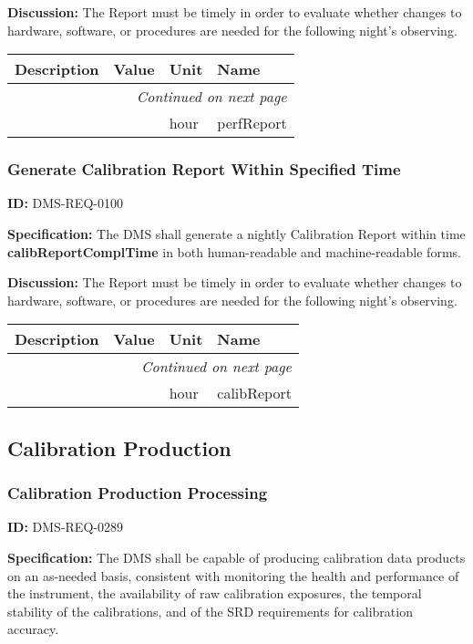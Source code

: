 \documentclass[SE,toc,lsstdraft]{lsstdoc}
\makeatletter
\newcommand{\paramname}[1]{\hspace{0pt}#1}
\newcommand{\unitname}[1]{\hspace{0pt}#1}
\newenvironment{parameters}[0]{%
\setlength\LTleft{0pt}
\setlength\LTright{\fill}
\begin{small}
\begin{longtable}[]{|p{0.5\textwidth}|l|p{0.6in}|p{1.74in}@{}|}

\hline \textbf{Description} & \textbf{Value} & \textbf{Unit} & \textbf{Name} \\ \hline
\endhead

\hline \multicolumn{4}{r}{\emph{Continued on next page}} \\
\endfoot

\hline\hline
\endlastfoot
}{%
\hline
\end{longtable}
\end{small}
}
\makeatother
\begin{document}
\textbf{Discussion:} The Report must be timely in order to evaluate whether changes to hardware, software, or procedures are needed for the following night's observing.



\begin{parameters}

&

&
\unitname{%
hour
}
&
\paramname{%
perfReport
} \\\hline
\end{parameters}




\subsubsection{Generate Calibration Report Within Specified Time}

\label{DMS-REQ-0100}
\textbf{ID:} DMS-REQ-0100

\textbf{Specification:} The DMS shall generate a nightly Calibration Report within time \textbf{calibReportComplTime }in both human-readable and machine-readable forms.

\textbf{Discussion:} The Report must be timely in order to evaluate whether changes to hardware, software, or procedures are needed for the following night's observing.



\begin{parameters}

&

&
\unitname{%
hour
}
&
\paramname{%
calibReport
} \\\hline
\end{parameters}




\subsection{Calibration Production}





\subsubsection{Calibration Production Processing}

\label{DMS-REQ-0289}
\textbf{ID:} DMS-REQ-0289

\textbf{Specification:} The DMS shall be capable of producing calibration data products on an as-needed basis, consistent with monitoring the health and performance of the instrument, the availability of raw calibration exposures, the temporal stability of the calibrations, and of the SRD requirements for calibration accuracy.
\end{document}
